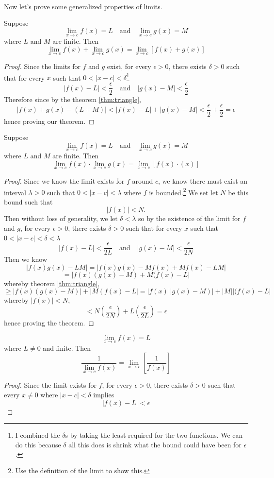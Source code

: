 \documentclass[11pt]{article}
\numberwithin{lemma}{section}
\numberwithin{equation}{section}
\numberwithin{define}{section}
\numberwithin{prop}{section}
\numberwithin{figure}{section}
\numberwithin{theorem}{section}
\numberwithin{cor}{section}
\newcounter{ex}[section]
\numberwithin{ex}{section}
\def\paren#1{\left(#1\right)}
\def\sbrak#1{\left[#1\right]}
\def\jand{\quad\text{and}\quad}
\begin{document}
Now let's prove some generalized properties of limits.

\begin{theorem}
Suppose
$$\lim_{x\to c}f(x)=L \jand \lim_{x\to c}g(x)=M$$
where $L$ and $M$ are finite. Then
$$\lim_{x\to c}f(x)+\lim_{x\to c}g(x)=\lim_{x\to c}\sbrak{f(x)+g(x)}$$
\end{theorem}
\begin{proof}
	Since the limits for $f$ and $g$ exist, for every $\epsilon>0$, there exists $\delta>0$ such that for every $x$ such that $0<|x-c|<\delta$\footnote{I combined the $\delta$s by taking the least required for the two functions. We can do this because $\delta$ all this does is shrink what the bound could have been for $\epsilon$.}
	$$|f(x)-L|<\frac{\epsilon}{2} \jand |g(x)-M|<\frac{\epsilon}{2}$$
	Therefore since by the theorem \eqref{thm:triangle},
	$$|f(x)+g(x)-(L+M)|<|f(x)-L|+|g(x)-M|<\frac{\epsilon}{2}+\frac{\epsilon}{2}=\epsilon$$
	hence proving our theorem.
\end{proof}

\begin{theorem}
Suppose
$$\lim_{x\to c}f(x)=L \jand \lim_{x\to c}g(x)=M$$
where $L$ and $M$ are finite. Then
$$\lim_{x\to c}f(x)\cdot\lim_{x\to c}g(x)=\lim_{x\to c}\sbrak{f(x)\cdot(x)}$$
\end{theorem}
\begin{proof}
	Since we know the limit exists for $f$ around $c$, we know there must exist an interval $\lambda>0$ such that $0<|x-c|<\lambda$ where $f$ is bounded.\footnote{
	Use the definition of the limit to show this.}
	We set let $N$ be this bound such that 
	$$|f(x)|<N.$$
	Then without loss of generality, we let $\delta<\lambda$ so by the existence of the limit for $f$ and $g$, for every $\epsilon>0$, there exists $\delta>0$ such that for every $x$ such that $0<|x-c|<\delta<\lambda$
	$$|f(x)-L|<\frac{\epsilon}{2L} \jand |g(x)-M|<\frac{\epsilon}{2N}$$
	Then we know
	$$|f(x)g(x)-LM|=|f(x)g(x)-Mf(x)+Mf(x)-LM|$$
	$$=|f(x)(g(x)-M)+M(f(x)-L|$$
	whereby theorem \eqref{thm:triangle},
	$$\ge |f(x)(g(x)-M)|+|M(f(x)-L|=|f(x)||g(x)-M)|+|M||(f(x)-L|$$
	whereby $|f(x)|<N$,
	$$<N\paren{\frac{\epsilon}{2N}}+L\paren{\frac{\epsilon}{2L}}=\epsilon$$
	hence proving the theorem.
\end{proof}

\begin{theorem}
	$$\lim_{x\to c}f(x)=L$$
where $L\neq0$ and finite. Then
$$\frac{1}{\lim_{x\to c}f(x)}=\lim_{x\to c}\sbrak{\frac{1}{f(x)}}$$
\end{theorem}
\begin{proof}
	Since the limit exists for $f$, for every $\epsilon>0$, there exists $\delta>0$ such that every $x\neq0$ where $|x-c|<\delta$ implies
	$$|f(x)-L|<\epsilon$$
\end{proof}
\end{document}
